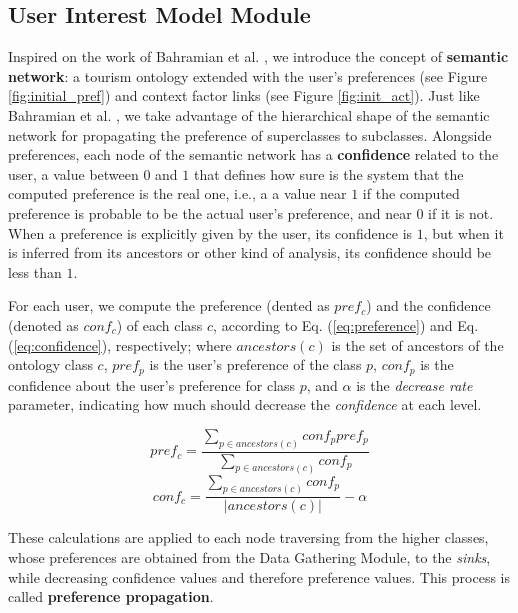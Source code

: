 \subsection{User Interest Model Module}
Inspired on the work of Bahramian et al. \cite{bahramian_abbaspour_claramunt_2017}, we introduce the concept of \textbf{semantic network}: a tourism ontology extended with the user's preferences (see Figure \ref{fig:initial_pref}) and context factor links
(see Figure \ref{fig:init_act}). Just like Bahramian et al. \cite{bahramian_abbaspour_claramunt_2017}, we take advantage of the hierarchical shape of the semantic network for propagating the preference of superclasses to subclasses. Alongside preferences, each node of the semantic network has a \textbf{confidence} related to the user, a value between $0$ and $1$ that defines how sure is the system that the computed preference is the real one, i.e., a 
a value near $1$ if the computed preference is probable to be the actual user's preference, and near $0$ if it is not. When a preference is explicitly given by the user, its confidence is $1$, but when it is inferred from its ancestors or other kind of analysis, its confidence should be less than $1$. 

For each user, we compute the preference (dented as $pref_c$) and the confidence (denoted as $conf_c$) of each class $c$, according to Eq. (\ref{eq:preference}) and Eq. (\ref{eq:confidence}), respectively; 
where $ancestors(c)$ is the set of ancestors of the ontology class $c$, $pref_p$ is the user's preference of the class $p$, $conf_p$ is the confidence about the user's preference for
class $p$, and $\alpha$ is  the \textit{decrease rate} parameter, indicating
how much should decrease the \textit{confidence} at each level. 

\begin{equation} \label{eq:preference}
    pref_c = \frac{\displaystyle \sum_{p \in ancestors(c)}{conf_p pref_p}}
    {\displaystyle  \sum_{p \in ancestors(c)} {conf_p}}
\end{equation}
\begin{equation} \label{eq:confidence}
    conf_c = \frac{\displaystyle \sum_{p \in ancestors(c)} {conf_p}}{|ancestors(c)|} - \alpha
\end{equation}

These calculations are applied to each node traversing from the higher classes, whose preferences are obtained from the Data Gathering Module, to the \textit{sinks}, while decreasing confidence values and therefore preference values. 
This process is called \textbf{preference propagation}. 

